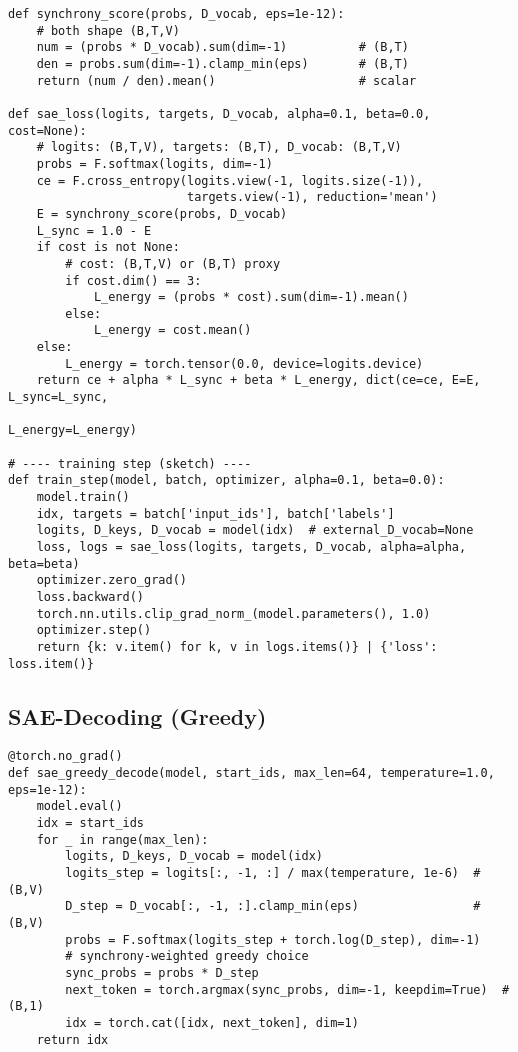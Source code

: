 \documentclass[11pt]{article}
\theoremstyle{plain}
\theoremstyle{definition}
\theoremstyle{remark}
\begin{document}
\begin{verbatim}
def synchrony_score(probs, D_vocab, eps=1e-12):
    # both shape (B,T,V)
    num = (probs * D_vocab).sum(dim=-1)          # (B,T)
    den = probs.sum(dim=-1).clamp_min(eps)       # (B,T)
    return (num / den).mean()                    # scalar

def sae_loss(logits, targets, D_vocab, alpha=0.1, beta=0.0, cost=None):
    # logits: (B,T,V), targets: (B,T), D_vocab: (B,T,V)
    probs = F.softmax(logits, dim=-1)
    ce = F.cross_entropy(logits.view(-1, logits.size(-1)),
                         targets.view(-1), reduction='mean')
    E = synchrony_score(probs, D_vocab)
    L_sync = 1.0 - E
    if cost is not None:
        # cost: (B,T,V) or (B,T) proxy
        if cost.dim() == 3:
            L_energy = (probs * cost).sum(dim=-1).mean()
        else:
            L_energy = cost.mean()
    else:
        L_energy = torch.tensor(0.0, device=logits.device)
    return ce + alpha * L_sync + beta * L_energy, dict(ce=ce, E=E, L_sync=L_sync,
                                                       L_energy=L_energy)

# ---- training step (sketch) ----
def train_step(model, batch, optimizer, alpha=0.1, beta=0.0):
    model.train()
    idx, targets = batch['input_ids'], batch['labels']
    logits, D_keys, D_vocab = model(idx)  # external_D_vocab=None
    loss, logs = sae_loss(logits, targets, D_vocab, alpha=alpha, beta=beta)
    optimizer.zero_grad()
    loss.backward()
    torch.nn.utils.clip_grad_norm_(model.parameters(), 1.0)
    optimizer.step()
    return {k: v.item() for k, v in logs.items()} | {'loss': loss.item()}
\end{verbatim}

\subsection{SAE-Decoding (Greedy)}

\begin{verbatim}
@torch.no_grad()
def sae_greedy_decode(model, start_ids, max_len=64, temperature=1.0, eps=1e-12):
    model.eval()
    idx = start_ids
    for _ in range(max_len):
        logits, D_keys, D_vocab = model(idx)
        logits_step = logits[:, -1, :] / max(temperature, 1e-6)  # (B,V)
        D_step = D_vocab[:, -1, :].clamp_min(eps)                # (B,V)
        probs = F.softmax(logits_step + torch.log(D_step), dim=-1)
        # synchrony-weighted greedy choice
        sync_probs = probs * D_step
        next_token = torch.argmax(sync_probs, dim=-1, keepdim=True)  # (B,1)
        idx = torch.cat([idx, next_token], dim=1)
    return idx
\end{verbatim}
\end{document}
